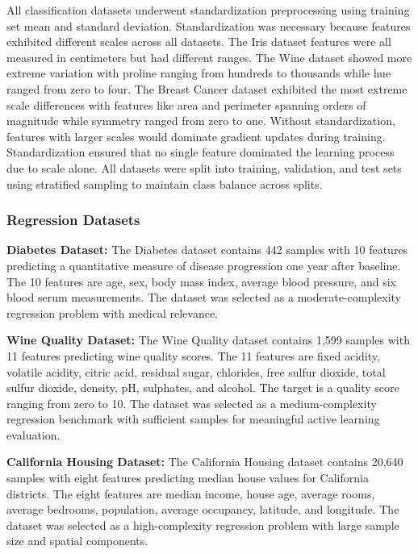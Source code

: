 \documentclass[conference]{IEEEtran}
\begin{document}
All classification datasets underwent standardization preprocessing using training set mean and standard deviation. Standardization was necessary because features exhibited different scales across all datasets. The Iris dataset features were all measured in centimeters but had different ranges. The Wine dataset showed more extreme variation with proline ranging from hundreds to thousands while hue ranged from zero to four. The Breast Cancer dataset exhibited the most extreme scale differences with features like area and perimeter spanning orders of magnitude while symmetry ranged from zero to one. Without standardization, features with larger scales would dominate gradient updates during training. Standardization ensured that no single feature dominated the learning process due to scale alone. All datasets were split into training, validation, and test sets using stratified sampling to maintain class balance across splits.

\subsubsection{Regression Datasets}

\textbf{Diabetes Dataset:}
The Diabetes dataset contains 442 samples with 10 features predicting a quantitative measure of disease progression one year after baseline. The 10 features are age, sex, body mass index, average blood pressure, and six blood serum measurements. The dataset was selected as a moderate-complexity regression problem with medical relevance.

\textbf{Wine Quality Dataset:}
The Wine Quality dataset contains 1,599 samples with 11 features predicting wine quality scores. The 11 features are fixed acidity, volatile acidity, citric acid, residual sugar, chlorides, free sulfur dioxide, total sulfur dioxide, density, pH, sulphates, and alcohol. The target is a quality score ranging from zero to 10. The dataset was selected as a medium-complexity regression benchmark with sufficient samples for meaningful active learning evaluation.

\textbf{California Housing Dataset:}
The California Housing dataset contains 20,640 samples with eight features predicting median house values for California districts. The eight features are median income, house age, average rooms, average bedrooms, population, average occupancy, latitude, and longitude. The dataset was selected as a high-complexity regression problem with large sample size and spatial components.
\end{document}
